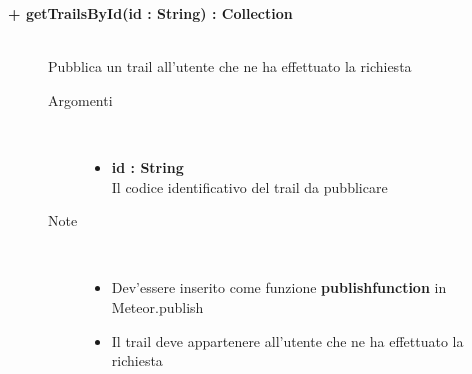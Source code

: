 \begin{description}
	\begin{description}
		\item[\textbf{\color{blue}+ getTrailsById(id : String) : Collection			}] \hfill \\
			Pubblica un trail all'utente che ne ha effettuato la richiesta
			
		\begin{description}
			\item[Argomenti] \hfill \\
				\begin{itemize}
				
					\item \textbf{id : String			} \hfill \\
					Il codice identificativo del trail da pubblicare
					
				\end{itemize}
			\item[Note] \hfill \\
			\begin{itemize}
					\item Dev'essere inserito come funzione \textbf{publishfunction} in Meteor.publish
					\item Il trail deve appartenere all'utente che ne ha effettuato la richiesta
				\end{itemize}
		\end{description}
	\end{description}
	
	
	
	
\end{description}